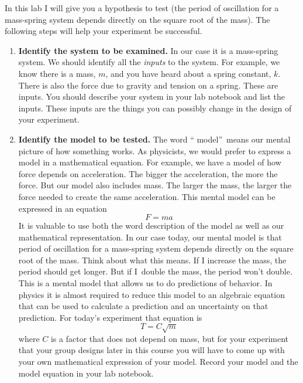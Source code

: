 \documentclass[twoside,11pt,ShortChapTitles]{BYUTextbook}
\begin{document}
In this lab I will give you a hypothesis to test (the period of oscillation
for a mass-spring system depends directly on the square root of the mass). The
following steps will help your experiment be successful.

\begin{enumerate}
\item {\bf Identify the system to be examined.} In our case it is a mass-spring
system. We should identify all the \emph{inputs} to the system. For example,
we know there is a mass, $m$, and you have heard about a spring constant, $k.
$ There is also the force due to gravity and tension on a spring. These are
inputs. You should describe your system in your lab notebook and list the
inputs. These inputs are the things you can possibly change in the design of
your experiment.

\item {\bf Identify the model to be tested.} The word \textquotedblleft
model\textquotedblright\ means our mental picture of how something works. As
physicists, we would prefer to express a model in a mathematical equation. For
example, we have a model of how force depends on acceleration. The bigger the
acceleration, the more the force. But our model also includes mass. The larger
the mass, the larger the force needed to create the same acceleration. This
mental model can be expressed in an equation
\[
F=ma
\]
It is valuable to use both the word description of the model as well as our
mathematical representation. In our case today, our mental model is that
period of oscillation for a mass-spring system depends directly on the square
root of the mass. Think about what this means. If I increase the mass, the
period should get longer. But if I\ double the mass, the period won't double.
This is a mental model that allows us to do predictions of behavior. In
physics it is almost required to reduce this model to an algebraic equation
that can be used to calculate a prediction and an uncertainty on that
prediction. For today's experiment that equation is
\[
T=C\sqrt{m}
\]
where $C$ is a factor that does not depend on mass, but for your experiment
that your group designs later in this course you will have to come up with
your own mathematical expression of your model. Record your model and the
model equation in your lab notebook.


\end{enumerate}
\end{document}
